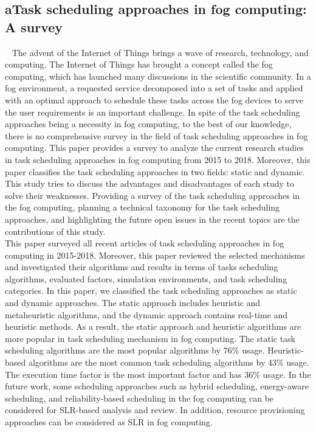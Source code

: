 \subsection{aTask scheduling approaches in fog computing: A survey}~\cite{hosseinioun2022atask}
The advent of the Internet of Things brings a wave of research, technology, and computing. 
The Internet of Things has brought a concept called the fog computing, which has launched many discussions in the scientific community. 
In a fog environment, a requested service decomposed into a set of tasks and applied with an optimal approach to schedule these tasks across the fog devices to serve
the user requirements is an important challenge. 
In spite of the task scheduling approaches being a necessity in fog computing, to the best of our knowledge,
there is no comprehensive survey in the field of task scheduling approaches in fog computing. 
This paper provides a survey to analyze the current research studies in task scheduling approaches in fog computing from 2015 to 2018.
Moreover, this paper classifies the task scheduling approaches in two fields: static and dynamic. 
This study tries to discuss the advantages and disadvantages of each study to solve their weaknesses. 
Providing a survey of the task scheduling approaches in the fog computing, planning a technical taxonomy for the task scheduling approaches, 
and highlighting the future open issues in the recent topics are the contributions of this study. \\
This paper surveyed all recent articles of task scheduling approaches in fog computing in 2015-2018.
Moreover, this paper reviewed the selected mechanisms and investigated their algorithms and results in terms of tasks scheduling algorithms,
evaluated factors, simulation environments, and task scheduling categories. 
In this paper, we classified the task scheduling approaches as static and dynamic approaches. 
The static approach includes heuristic and metaheuristic algorithms,
and the dynamic approach contains real-time and heuristic methods. 
As a result, the static approach and heuristic algorithms are more popular in task scheduling mechanism in fog computing. 
The static task scheduling algorithms are the most popular algorithms by 76\% usage. 
Heuristic-based algorithms are the most common task scheduling algorithms by 43\% usage. 
The execution time factor is the most important factor and has 36\% usage.
In the future work, some scheduling approaches such as hybrid scheduling, energy-aware scheduling, and reliability-based scheduling in the
fog computing can be considered for SLR-based analysis and review. 
In addition, resource provisioning approaches can be considered as SLR in fog computing.\\

